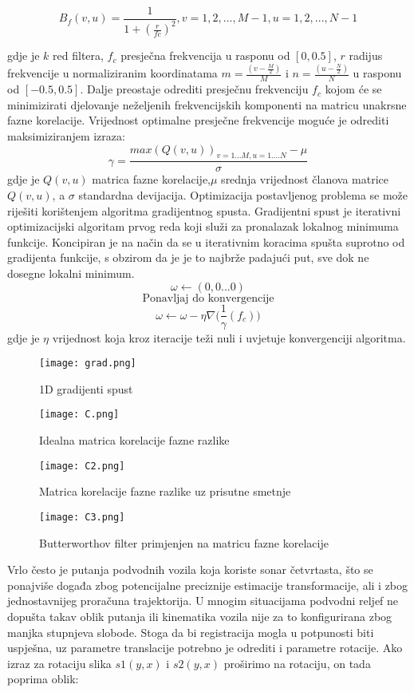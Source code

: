 \documentclass[times, utf8, diplomski]{fer}
\begin{document}
$$ B_f(v,u) = \frac{1}{1+( \frac{r}{fc} )^2}, v=1,2,...,M-1,u=1,2,...,N-1 $$

gdje je  $k$ red filtera, $f_c$ presječna frekvencija u rasponu od $[0 ,0.5]$, $r$ radijus frekvencije u normaliziranim koordinatama $ m =\frac{(v-\frac{M}{2})}{M}$ i $ n =\frac{(u-\frac{N}{2})}{N}$ u rasponu od $[-0.5, 0.5]$. Dalje preostaje odrediti presječnu frekvenciju $f_c$ kojom će se minimizirati djelovanje neželjenih frekvencijskih komponenti na matricu unakrsne fazne korelacije. Vrijednost optimalne presječne frekvencije moguće je odrediti maksimiziranjem izraza:
 $$\gamma =\frac{max(Q(v,u))_{v=1...M,u=1....N}-\mu}{\sigma}$$
 gdje je $Q(v,u)$ matrica fazne korelacije,$\mu$ srednja vrijednost članova matrice $Q(v,u)$, a $\sigma$ standardna devijacija. Optimizacija postavljenog problema se može riješiti korištenjem algoritma gradijentnog spusta. Gradijentni spust je iterativni optimizacijski algoritam prvog reda koji služi za pronalazak lokalnog minimuma funkcije. Koncipiran je na način da se u iterativnim koracima spušta suprotno od gradijenta funkcije, s obzirom da je je to najbrže padajući put, sve dok ne dosegne lokalni minimum. 
 $$ \omega \leftarrow (0,0...0)$$
  $$ \textrm{Ponavljaj do konvergencije} $$   
 $$\omega \leftarrow \omega - \eta \nabla \bigg (\frac{1}{\gamma}(f_c) \bigg )$$             
 gdje je $\eta $ vrijednost koja kroz iteracije teži nuli i uvjetuje konvergenciji algoritma.


\begin{figure}[htb]
\centering
\texttt{[image: grad.png]}
\caption{1D gradijenti spust}
\label{fig:Pred-obrada slika sonara}
\end{figure}

\begin{figure}[htb]
\centering
\texttt{[image: C.png]}	
		\caption{Idealna matrica korelacije fazne razlike}
		\label{fig:Idealna matrica korelacije fazne razlike}
\end{figure}

\begin{figure}[htb]
\centering
\texttt{[image: C2.png]}
		\caption{Matrica korelacije fazne razlike uz prisutne smetnje}
		\label{fig:matrica korelacije fazne razlike uz prisutne smetnje}
\end{figure}

\begin{figure}[htb]
\centering
 \texttt{[image: C3.png]}
		\caption{Butterworthov filter primjenjen na matricu fazne korelacije}
		\label{fig:Butterworthov filter primjenjen na matricu fazne korelacije}
\label{fig:}
\end{figure}
Vrlo često je putanja podvodnih vozila koja koriste sonar četvrtasta, što se  ponajviše događa zbog potencijalne preciznije estimacije transformacije, ali i zbog jednostavnijeg proračuna trajektorija. U mnogim situacijama podvodni reljef ne dopušta takav oblik putanja ili kinematika vozila nije za to konfigurirana zbog manjka stupnjeva slobode. Stoga da bi registracija mogla u potpunosti biti uspješna, uz parametre translacije potrebno je odrediti i parametre rotacije.
Ako izraz za rotaciju slika $s1(y,x)$ i $s2(y,x)$ proširimo na rotaciju, on tada poprima oblik:
\end{document}
